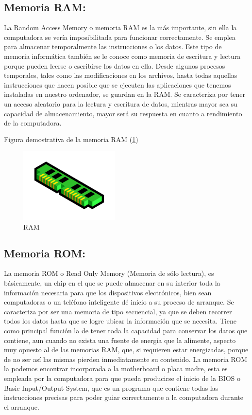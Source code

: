 \documentclass{article}
\begin{document}
\subsection{Memoria RAM:}
La Random Access Memory o memoria RAM es la más importante, sin ella la computadora se vería imposibilitada para funcionar correctamente. Se emplea para almacenar temporalmente las instrucciones o los datos. Este tipo de memoria informática también se le conoce como memoria de escritura y lectura porque pueden leerse o escribirse los datos en ella. Desde algunos procesos temporales, tales como las modificaciones en los archivos, hasta todas aquellas instrucciones que hacen posible que se ejecuten las aplicaciones que tenemos instaladas en nuestro ordenador, se guardan en la RAM.\newline
Se caracteriza por tener un acceso aleatorio para la lectura y escritura de datos, mientras mayor sea su capacidad de almacenamiento, mayor será su respuesta en cuanto a rendimiento de la computadora.\newline

Figura demostrativa de la memoria RAM (\ref{fig_ram})\newline

\begin{figure}[h]
\includegraphics[width=5cm]{ram.png}
\centering
\caption{RAM}
\label{fig_ram}
\end{figure}

\subsection{Memoria ROM:}
La memoria ROM o Read Only Memory (Memoria de sólo lectura), es básicamente, un chip en el que se puede almacenar en su interior toda la información necesaria para que los dispositivos electrónicos, bien sean computadoras o un teléfono inteligente dé inicio a su proceso de arranque. Se caracteriza por ser una memoria de tipo secuencial, ya que se deben recorrer todos los datos hasta que se logre ubicar la información que se necesita. Tiene como principal función la de tener toda la capacidad para conservar los datos que contiene, aun cuando no exista una fuente de energía que la alimente, aspecto muy opuesto al de las memorias RAM, que, si requieren estar energizadas, porque de no ser así las mismas pierden inmediatamente su contenido.\newline
La memoria ROM la podemos encontrar incorporada a la motherboard o placa madre, esta es empleada por la computadora para que pueda producirse el inicio de la BIOS o Basic Input/Output System, que es un programa que contiene todas las instrucciones precisas para poder guiar correctamente a la computadora durante el arranque.\newline
\end{document}
